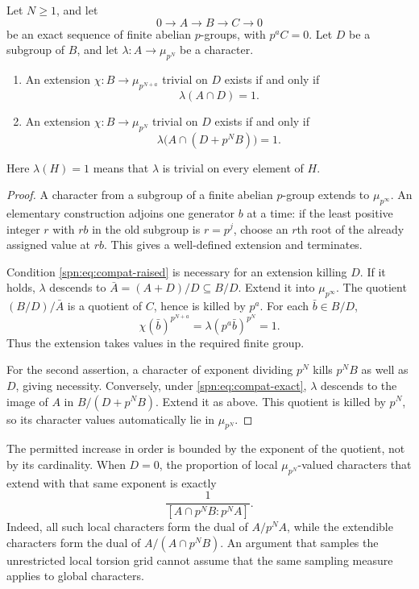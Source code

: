 \begin{theorem}\label{spn:thm:extension}
Let $N\ge1$, and let
\[
 0\longrightarrow A\longrightarrow B\longrightarrow C\longrightarrow0
\]
be an exact sequence of finite abelian $p$-groups, with $p^aC=0$. Let $D$ be
a subgroup of $B$, and let $\lambda\colon A\to\mu_{p^N}$ be a character.
\begin{enumerate}
\item An extension $\chi\colon B\to\mu_{p^{N+a}}$ trivial on $D$ exists if
and only if
\begin{equation}\label{spn:eq:compat-raised}
 \lambda(A\cap D)=1 .
\end{equation}
\item An extension $\chi\colon B\to\mu_{p^N}$ trivial on $D$ exists if and
only if
\begin{equation}\label{spn:eq:compat-exact}
 \lambda\bigl(A\cap(D+p^NB)\bigr)=1 .
\end{equation}
\end{enumerate}
Here $\lambda(H)=1$ means that $\lambda$ is trivial on every element of $H$.
\end{theorem}

\begin{proof}
A character from a subgroup of a finite abelian $p$-group extends to
$\mu_{p^\infty}$. An elementary construction adjoins one generator $b$ at a
time: if the least positive integer $r$ with $rb$ in the old subgroup is
$r=p^j$, choose an $r$th root of the already assigned value at $rb$. This
gives a well-defined extension and terminates.

Condition \eqref{spn:eq:compat-raised} is necessary for an extension killing
$D$. If it holds, $\lambda$ descends to $\bar A=(A+D)/D\subseteq B/D$. Extend
it into $\mu_{p^\infty}$. The quotient $(B/D)/\bar A$ is a quotient of $C$,
hence is killed by $p^a$. For each $\bar b\in B/D$,
\[
 \chi(\bar b)^{p^{N+a}}=\lambda(p^a\bar b)^{p^N}=1 .
\]
Thus the extension takes values in the required finite group.

For the second assertion, a character of exponent dividing $p^N$ kills $p^NB$
as well as $D$, giving necessity. Conversely, under
\eqref{spn:eq:compat-exact}, $\lambda$ descends to the image of $A$ in
$B/(D+p^NB)$. Extend it as above. This quotient is killed by $p^N$, so its
character values automatically lie in $\mu_{p^N}$.
\end{proof}

The permitted increase in order is bounded by the exponent of the quotient,
not by its cardinality. When $D=0$, the proportion of local
$\mu_{p^N}$-valued characters that extend with that same exponent is exactly
\begin{equation}\label{spn:eq:proportion}
 \frac{1}{[A\cap p^NB:p^NA]} .
\end{equation}
Indeed, all such local characters form the dual of $A/p^NA$, while the
extendible characters form the dual of $A/(A\cap p^NB)$. An argument that
samples the unrestricted local torsion grid cannot assume that the same
sampling measure applies to global characters.

